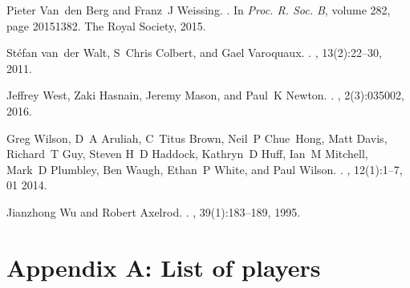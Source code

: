 \documentclass[10pt,letterpaper]{article}
\begin{document}
\begin{thebibliography}{10}
Pieter Van~den Berg and Franz~J Weissing.
.
\newblock In {\em Proc. R. Soc. B}, volume 282, page 20151382. The Royal
  Society, 2015.

St{\'e}fan van~der Walt, S~Chris Colbert, and Gael Varoquaux.
.
, 13(2):22--30, 2011.

Jeffrey West, Zaki Hasnain, Jeremy Mason, and Paul~K Newton.
.
, 2(3):035002, 2016.

Greg Wilson, D~A Aruliah, C~Titus Brown, Neil~P Chue~Hong, Matt Davis,
  Richard~T Guy, Steven H~D Haddock, Kathryn~D Huff, Ian~M Mitchell, Mark~D
  Plumbley, Ben Waugh, Ethan~P White, and Paul Wilson.
.
, 12(1):1--7, 01 2014.

Jianzhong Wu and Robert Axelrod.
.
, 39(1):183--189, 1995.

\end{thebibliography}

\appendix

\section{Appendix A: List of players}\label{app:list_of_players}
\end{document}
